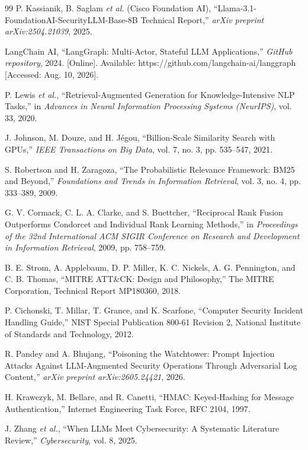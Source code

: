 \documentclass[12pt,a4paper]{report}
\begin{document}
\begin{thebibliography}{99}
P. Kassianik, B. Saglam \textit{et al.} (Cisco Foundation AI), ``Llama-3.1-FoundationAI-SecurityLLM-Base-8B Technical Report,'' \textit{arXiv preprint arXiv:2504.21039}, 2025.

LangChain AI, ``LangGraph: Multi-Actor, Stateful LLM Applications,'' \textit{GitHub repository}, 2024. [Online]. Available: https://github.com/langchain-ai/langgraph [Accessed: Aug. 10, 2026].

P. Lewis \textit{et al.}, ``Retrieval-Augmented Generation for Knowledge-Intensive NLP Tasks,'' in \textit{Advances in Neural Information Processing Systems (NeurIPS)}, vol. 33, 2020.

J. Johnson, M. Douze, and H. Jégou, ``Billion-Scale Similarity Search with GPUs,'' \textit{IEEE Transactions on Big Data}, vol. 7, no. 3, pp. 535--547, 2021.

S. Robertson and H. Zaragoza, ``The Probabilistic Relevance Framework: BM25 and Beyond,'' \textit{Foundations and Trends in Information Retrieval}, vol. 3, no. 4, pp. 333--389, 2009.

G. V. Cormack, C. L. A. Clarke, and S. Buettcher, ``Reciprocal Rank Fusion Outperforms Condorcet and Individual Rank Learning Methods,'' in \textit{Proceedings of the 32nd International ACM SIGIR Conference on Research and Development in Information Retrieval}, 2009, pp. 758--759.

B. E. Strom, A. Applebaum, D. P. Miller, K. C. Nickels, A. G. Pennington, and C. B. Thomas, ``MITRE ATT\&CK: Design and Philosophy,'' The MITRE Corporation, Technical Report MP180360, 2018.

P. Cichonski, T. Millar, T. Grance, and K. Scarfone, ``Computer Security Incident Handling Guide,'' NIST Special Publication 800-61 Revision 2, National Institute of Standards and Technology, 2012.

R. Pandey and A. Bhujang, ``Poisoning the Watchtower: Prompt Injection Attacks Against LLM-Augmented Security Operations Through Adversarial Log Content,'' \textit{arXiv preprint arXiv:2605.24421}, 2026.

H. Krawczyk, M. Bellare, and R. Canetti, ``HMAC: Keyed-Hashing for Message Authentication,'' Internet Engineering Task Force, RFC 2104, 1997.

J. Zhang \textit{et al.}, ``When LLMs Meet Cybersecurity: A Systematic Literature Review,'' \textit{Cybersecurity}, vol. 8, 2025.


\end{thebibliography}
\end{document}
